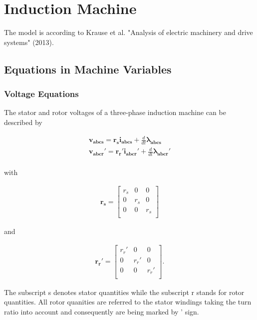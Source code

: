 \section{Induction Machine}

The model is according to Krause et al. "Analysis of electric machinery and drive systems" (2013). 

\subsection{Equations in Machine Variables}

\subsubsection{Voltage Equations}
\begin{flushleft}
The stator and rotor voltages of a three-phase induction machine can be described by

\begin{align*}
\mathbf{v_{abcs}} = \mathbf{r_s} \mathbf{i_{abcs}} + \frac{d}{dt} \mathbf{\lambda_{abcs}} \\
\mathbf{v_{abcr}'} = \mathbf{r_r'} \mathbf{i_{abcr}'} + \frac{d}{dt} \mathbf{\lambda_{abcr}'} \\
\end{align*}

with

\begin{align*}
\mathbf{r_s} =
\begin{bmatrix}
r_s & 0 & 0 \\
0 & r_s & 0 \\
0 & 0 & r_s \\
\end{bmatrix}
\end{align*}

and 

\begin{align*}
\mathbf{r_r'} =
\begin{bmatrix}
r_r' & 0 & 0 \\
0 & r_r' & 0 \\
0 & 0 & r_r' \\
\end{bmatrix}.
\end{align*}

The subscript s denotes stator quantities while the subscript r stands for rotor quantities. All rotor quanities are referred to the stator windings taking the turn ratio into account and consequently are being marked by ' sign.


\end{flushleft}
